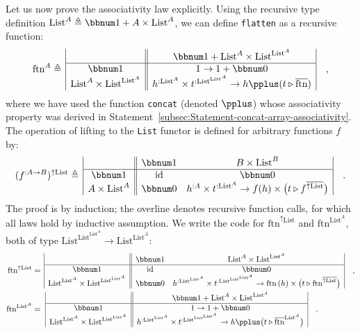 Let us now prove the associativity law explicitly. Using the recursive
type definition $\text{List}^{A}\triangleq\bbnum 1+A\times\text{List}^{A}$,
we can define \lstinline!flatten! as a recursive function:
\[
\text{ftn}^{A}\triangleq\,\begin{array}{|c||c|}
 & \bbnum 1+\text{List}^{A}\times\text{List}^{\text{List}^{A}}\\
\hline \bbnum 1 & 1\rightarrow1+\bbnum 0\\
\text{List}^{A}\times\text{List}^{\text{List}^{A}} & h^{:\text{List}^{A}}\times t^{:\text{List}^{\text{List}^{A}}}\rightarrow h\pplus(t\triangleright\overline{\text{ftn}})
\end{array}\quad,
\]
where we have used the function \lstinline!concat! (denoted $\pplus$)
whose associativity property was derived in Statement~\ref{subsec:Statement-concat-array-associativity}.
The operation of lifting to the \lstinline!List! functor is defined
for arbitrary functions $f$ by:
\[
(f^{:A\rightarrow B})^{\uparrow\text{List}}\triangleq\,\begin{array}{|c||cc|}
 & \bbnum 1 & B\times\text{List}^{B}\\
\hline \bbnum 1 & \text{id} & \bbnum 0\\
A\times\text{List}^{A} & \bbnum 0 & h^{:A}\times t^{:\text{List}^{A}}\rightarrow f(h)\times\big(t\triangleright f^{\overline{\uparrow\text{List}}}\big)
\end{array}\quad.
\]
The proof is by induction; the overline denotes recursive function
calls, for which all laws hold by inductive assumption. We write the
code for $\text{ftn}^{\uparrow\text{List}}$ and $\text{ftn}^{\text{List}^{A}}$,
both of type $\text{List}^{\text{List}^{\text{List}^{A}}}\rightarrow\text{List}^{\text{List}^{A}}$:
\begin{align*}
\text{ftn}^{\uparrow\text{List}} & =\,\begin{array}{|c||cc|}
 & \bbnum 1 & \text{List}^{A}\times\text{List}^{\text{List}^{A}}\\
\hline \bbnum 1 & \text{id} & \bbnum 0\\
\text{List}^{\text{List}^{A}}\times\text{List}^{\text{List}^{\text{List}^{A}}} & \bbnum 0 & h^{:\text{List}^{\text{List}^{A}}}\times t^{:\text{List}^{\text{List}^{\text{List}^{A}}}}\rightarrow\text{ftn}\,(h)\times\big(t\triangleright\text{ftn}^{\overline{\uparrow\text{List}}}\big)
\end{array}\quad,\\
\text{ftn}^{\text{List}^{A}} & =\,\,\begin{array}{|c||c|}
 & \bbnum 1+\text{List}^{A}\times\text{List}^{\text{List}^{A}}\\
\hline \bbnum 1 & 1\rightarrow1+\bbnum 0\\
\text{List}^{\text{List}^{A}}\times\text{List}^{\text{List}^{\text{List}^{A}}} & h^{:\text{List}^{\text{List}^{A}}}\times t^{:\text{List}^{\text{List}^{\text{List}^{A}}}}\rightarrow h\pplus\big(t\triangleright\overline{\text{ftn}}^{\text{List}^{A}}\big)
\end{array}\quad.
\end{align*}

